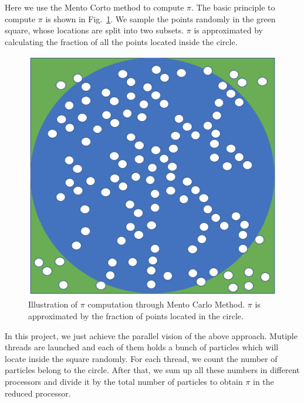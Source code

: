 \documentclass[10pt,twocolumn,letterpaper]{article}
\begin{document}
    Here we use the Mento Corto method to compute $\pi$. The basic principle to 
    compute $\pi$ is shown in Fig.~\ref{mentoCarlo}. We sample the points randomly in 
    the green square, whose locations are split into two subsets. $\pi$ is approximated 
    by calculating the fraction of all the points located inside the circle. 
    \begin{figure}[t]
        \begin{center}
           \includegraphics[width=0.8\linewidth]{images/computation.png}
        \end{center}
           \caption{Illustration of $\pi$ computation through Mento Carlo Method. $\pi$ is
           approximated by the fraction of points located in the circle.}
        \label{fig:long}
        \label{fig:onecol}
        \label{mentoCarlo}
    \end{figure}
    
    In this project, we just achieve the parallel vision of the above approach. Mutiple threads are launched and each of them 
    holds a bunch of particles which will locate inside the square randomly. For each thread, we count the 
    number of particles belong to the circle. After that, we sum up all these numbers in different processors
    and divide it by the total number of particles to obtain  $\pi$ in the reduced processor. 
    
\end{document}
